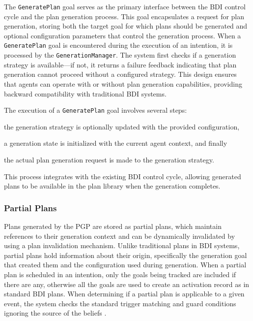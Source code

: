 \documentclass[12pt,a4paper,openright,twoside]{book}
\begin{document}
The \texttt{GeneratePlan} goal serves as the primary interface between the \ac{BDI} control cycle and the plan generation process.
%
This goal encapsulates a request for plan generation, storing both the target goal for which plans should be generated and optional configuration parameters that control the generation process.
%
When a \texttt{GeneratePlan} goal is encountered during the execution of an intention, it is processed by the \texttt{GenerationManager}.
%
The system first checks if a generation strategy is available---if not, it returns a failure feedback indicating that plan generation cannot proceed without a configured strategy.
%
This design ensures that agents can operate with or without plan generation capabilities, providing backward compatibility with traditional BDI systems.

The execution of a \texttt{GeneratePlan} goal involves several steps:
%
\begin{inlinelist}
    \item the generation strategy is optionally updated with the provided configuration,
    \item a generation state is initialized with the current agent context, and finally
    \item the actual plan generation request is made to the generation strategy.
\end{inlinelist} 
%
This process integrates with the existing \ac{BDI} control cycle, allowing generated plans to be available in the plan library when the generation completes.

\subsubsection{Partial Plans}

Plans generated by the \ac{PGP} are stored as partial plans, which maintain references to their generation context and can be dynamically invalidated by using a plan invalidation mechanism.
%
Unlike traditional plans in \ac{BDI} systems, partial plans hold information about their origin, specifically the generation goal that created them and the configuration used during generation.
%
When a partial plan is scheduled in an intention, only the goals being tracked are included if there are any, otherwise all the goals are used to create an activation record as in standard \ac{BDI} plans.
%
When determining if a partial plan is applicable to a given event, the system checks the standard trigger matching and guard conditions ignoring the source of the beliefs \footnotemark{}.
%
\end{document}

